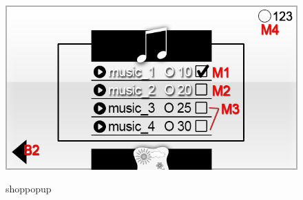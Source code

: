 \begin{figure}[H]
\label{fig:shop_popup}
\centering
\includegraphics[scale=0.55]{../GUI-Entwurf/_jpeg_numeration/shop_popup.jpg}
\caption{shoppopup}
\end{figure}






